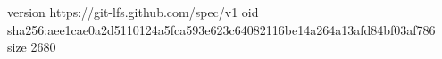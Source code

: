 version https://git-lfs.github.com/spec/v1
oid sha256:aee1cae0a2d5110124a5fca593e623c64082116be14a264a13afd84bf03af786
size 2680
